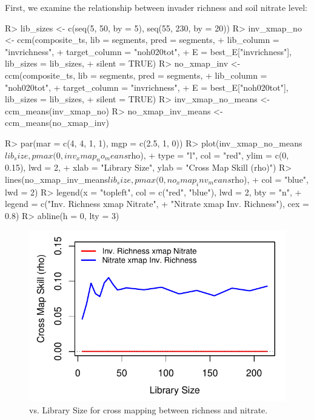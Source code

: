 \documentclass[article]{jss}
\begin{document}
First, we examine the relationship between invader richness and soil nitrate level:
\begin{Schunk}
\begin{Sinput}
R> lib_sizes <- c(seq(5, 50, by = 5), seq(55, 230, by = 20))
R> inv_xmap_no <- ccm(composite_ts, lib = segments, pred = segments, 
+                     lib_column = "invrichness", 
+                     target_column = "noh020tot", 
+                     E = best_E["invrichness"], lib_sizes = lib_sizes, 
+                     silent = TRUE)
R> no_xmap_inv <- ccm(composite_ts, lib = segments, pred = segments, 
+                     lib_column = "noh020tot", 
+                     target_column = "invrichness", 
+                     E = best_E["noh020tot"], lib_sizes = lib_sizes, 
+                     silent = TRUE)
R> inv_xmap_no_means <- ccm_means(inv_xmap_no)
R> no_xmap_inv_means <- ccm_means(no_xmap_inv)
\end{Sinput}
\end{Schunk}

\begin{Schunk}
\begin{Sinput}
R> par(mar = c(4, 4, 1, 1), mgp = c(2.5, 1, 0))
R> plot(inv_xmap_no_means$lib_size, pmax(0, inv_xmap_no_means$rho), 
+       type = "l", col = "red", ylim = c(0, 0.15), lwd = 2, 
+       xlab = "Library Size", ylab = "Cross Map Skill (rho)")
R> lines(no_xmap_inv_means$lib_size, pmax(0, no_xmap_inv_means$rho), 
+        col = "blue", lwd = 2)
R> legend(x = "topleft", col = c("red", "blue"), lwd = 2, bty = "n", 
+         legend = c("Inv. Richness xmap Nitrate", 
+                    "Nitrate xmap Inv. Richness"), cex = 0.8)
R> abline(h = 0, lty = 3)
\end{Sinput}
\end{Schunk}

\begin{figure}[t!]
\begin{center}
\includegraphics[width=4.5in]{article-ccm-e120-inv-no}
\end{center}
\caption{\label{fig:ccm-e120-inv-no}  vs. Library Size for cross mapping between richness and nitrate.}
\end{figure}
\end{document}
